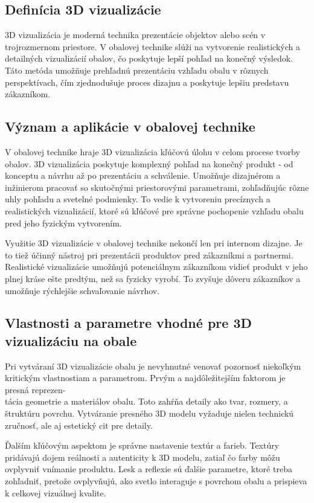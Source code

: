     \subsection{Definícia 3D vizualizácie}
      3D vizualizácia je moderná technika prezentácie objektov alebo scén v trojrozmernom priestore. V obalovej technike slúži na vytvorenie realistických a detailných vizualizácií obalov, čo poskytuje lepší pohľad na konečný výsledok. Táto metóda umožňuje prehľadnú prezentáciu vzhľadu obalu v rôznych perspektívach, čím zjednodušuje proces dizajnu a poskytuje lepšiu predstavu zákazníkom.

    \subsection{Význam a aplikácie v obalovej technike}
      V obalovej technike hraje 3D vizualizácia kľúčovú úlohu v celom procese tvorby obalov. 3D vizualizácia poskytuje komplexný pohľad na konečný produkt - od konceptu a návrhu až po prezentáciu a schválenie. Umožňuje dizajnérom a inžinierom pracovať so skutočnými priestorovými parametrami, zohľadňujúc rôzne uhly pohľadu a svetelné podmienky. To vedie k vytvoreniu precíznych a realistických vizualizácií, ktoré sú kľúčové pre správne pochopenie vzhľadu obalu pred jeho fyzickým vytvorením.

Využitie 3D vizualizácie v obalovej technike nekončí len pri internom dizajne. Je to tiež účinný nástroj pri prezentácii produktov pred zákazníkmi a partnermi. Realistické vizualizácie umožňujú potenciálnym zákazníkom vidieť produkt v jeho plnej kráse ešte predtým, než sa fyzicky vyrobí. To zvyšuje dôveru zákazníkov a umožňuje rýchlejšie schvaľovanie návrhov.

    \subsection{Vlastnosti a parametre vhodné pre 3D vizualizáciu na obale}
      Pri vytváraní 3D vizualizácie obalu je nevyhnutné venovať pozornosť niekoľkým kritickým vlastnostiam a parametrom. Prvým a najdôležitejším faktorom je presná reprezen-\\tácia geometrie a materiálov obalu. Toto zahŕňa detaily ako tvar, rozmery, a štruktúru povrchu. Vytváranie presného 3D modelu vyžaduje nielen technickú zručnosť, ale aj estetický cit pre detaily.

      Ďalším kľúčovým aspektom je správne nastavenie textúr a farieb. Textúry pridávajú dojem reálnosti a autenticity k 3D modelu, zatiaľ čo farby môžu ovplyvniť vnímanie produktu. Lesk a reflexie sú ďalšie parametre, ktoré treba zohľadniť, pretože ovplyvňujú, ako svetlo interaguje s povrchom obalu a prispieva k celkovej vizuálnej kvalite.

